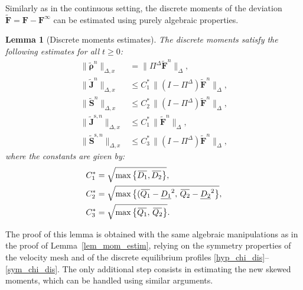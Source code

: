 \documentclass[reqno]{amsart}
\newtheorem{Lemma}{Lemma}
\newcommand{\Ft}{{\widetilde{F}}}
\newcommand{\rhot}{\widetilde{\rho}}
\newcommand{\Jt}{\widetilde{J}}
\newcommand{\St}{\widetilde{S}}
\newcommand{\Ftbf}{\mathbf{\Ft}}
\newcommand{\Fbf}{\mathbf{F}}
\newcommand{\rhotbf}{\boldsymbol{\rhot}}
\newcommand{\Jtbf}{\mathbf{\Jt}}
\newcommand{\Stbf}{\mathbf{\St}}
\newcommand{\lbr}{\left\lbrace}
\newcommand{\rbr}{\right\rbrace}
\newcommand{\overbar}[1]{\mkern 1.5mu\overline{\mkern-1.5mu#1\mkern-1.5mu}\mkern 1.5mu}
\numberwithin{equation}{section}
\begin{document}


Similarly as in the continuous setting, the discrete moments of the deviation $\Ftbf=\Fbf-\Fbf^\infty$ can be estimated using purely algebraic properties.
\begin{Lemma}[Discrete moments estimates]\label{lem_mom_estim_disc}
    The discrete moments satisfy the following estimates for all $t\geq 0$:
    \begin{align}
        \|\rhotbf^{n}\|_{\Delta,x}&=\|\Pi^\Delta \Ftbf^n\|_\Delta, \label{estim_rhot_dis} \\
        \|\Jtbf^n\|_{\Delta,x}&\leq C_{1}^*\,\|(I-\Pi^\Delta)\Ftbf^n\|_\Delta,\label{estim_J2_dis}\\
        \|\Stbf^{n}\|_{\Delta,x}&\leq C_{2}^*\,\|(I-\Pi^\Delta)\Ftbf^n\|_\Delta, \label{estim_S_dis}\\
        \|\Jtbf^{\mathrm{s},n}\|_{\Delta,x}&\leq C_1^*\,\|\Ftbf^n\|_\Delta, \label{estim_Jb_dis}\\ 
        \|\Stbf^{\mathrm{s},n}\|_{\Delta,x}&\leq C_{3}^*\,\|(I-\Pi^\Delta)\Ftbf^n\|_\Delta, \label{estim_Sb_dis}
    \end{align}
    where the constants are given by:
    \begin{align}
        C_{1}^* &= \sqrt{\max\lbr\overbar{D_1},\overbar{D_2}\rbr},\label{def.CJ*}\\
        C_{2}^* &= \sqrt{\max\lbr (\overbar{Q_1}-\underline{D_1}^2,\,\overbar{Q_2}-\underline{D_2}^2 \rbr},\\
        C_3^* &= \sqrt{\max\lbr \overbar{Q_1},\,\overbar{Q_2} \rbr}.
    \end{align}
\end{Lemma}
The proof of this lemma is obtained with the same algebraic manipulations as in the proof of Lemma~\ref{lem_mom_estim}, relying on the symmetry properties of the velocity mesh and of the discrete equilibrium profiles \eqref{hyp_chi_dis}--\eqref{sym_chi_dis}. The only additional step consists in estimating the new skewed moments, which can be handled using similar arguments.
\end{document}
